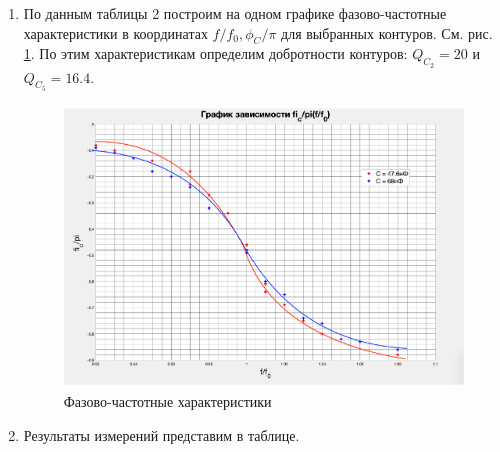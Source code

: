 \documentclass[a4paper,14pt]{article}
\begin{document}
\begin{enumerate}
\item По данным таблицы 2 построим на одном графике фазово-частотные характеристики в координатах $f/f_0,\phi_C /\pi$ для выбранных контуров. См. рис. \ref{gr3}. По этим характеристикам определим добротности контуров: $Q_{C_2} = 20$ и $Q_{C_5} = 16.4$.

\begin{center}
	\begin{figure}[bhtp]
		\centering
		\includegraphics[width=\linewidth]{gr3.pdf}
		\caption{Фазово-частотные характеристики}
		\label{gr3}
	\end{figure}
\end{center}


\clearpage


\item Результаты измерений представим в таблице.



\end{enumerate}
\end{document}
